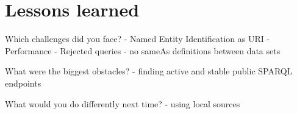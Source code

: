 \section{Lessons learned}
Which challenges did you face?
- Named Entity Identification as URI
- Performance
- Rejected queries
- no sameAs definitions between data sets


What were the biggest obstacles?
- finding active and stable public SPARQL endpoints


What would you do differently next time?
- using local sources